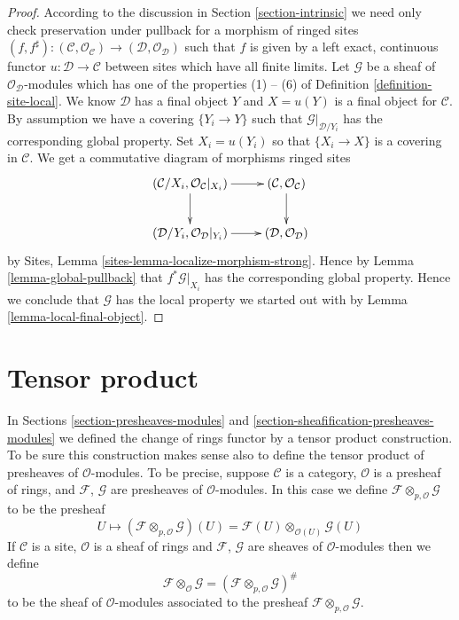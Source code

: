 \begin{proof}
According to the discussion in Section \ref{section-intrinsic}
we need only check preservation under pullback for a morphism of ringed sites
$(f, f^\sharp) :
(\mathcal{C}, \mathcal{O}_\mathcal{C})
\to
(\mathcal{D}, \mathcal{O}_\mathcal{D})$
such that $f$ is given by a left exact, continuous functor
$u : \mathcal{D} \to \mathcal{C}$ between sites which have
all finite limits.
Let $\mathcal{G}$ be a sheaf of $\mathcal{O}_\mathcal{D}$-modules
which has one of the properties (1) -- (6) of
Definition \ref{definition-site-local}.
We know $\mathcal{D}$ has a final object $Y$ and $X = u(Y)$
is a final object for $\mathcal{C}$. By assumption we have
a covering $\{Y_i \to Y\}$ such that $\mathcal{G}|_{\mathcal{D}/Y_i}$
has the corresponding global property. Set $X_i = u(Y_i)$ so
that $\{X_i \to X\}$ is a covering in $\mathcal{C}$.
We get a commutative diagram of morphisms ringed sites
$$
\xymatrix{
(\mathcal{C}/X_i, \mathcal{O}_\mathcal{C}|_{X_i}) \ar[r] \ar[d] &
(\mathcal{C}, \mathcal{O}_\mathcal{C}) \ar[d] \\
(\mathcal{D}/Y_i, \mathcal{O}_\mathcal{D}|_{Y_i}) \ar[r] &
(\mathcal{D}, \mathcal{O}_\mathcal{D})
}
$$
by Sites, Lemma \ref{sites-lemma-localize-morphism-strong}.
Hence by Lemma \ref{lemma-global-pullback}
that $f^*\mathcal{G}|_{X_i}$ has the corresponding global
property. Hence we conclude that $\mathcal{G}$ has the local
property we started out with by Lemma \ref{lemma-local-final-object}.
\end{proof}







\section{Tensor product}
\label{section-tensor-product}

\noindent
In Sections \ref{section-presheaves-modules} and
\ref{section-sheafification-presheaves-modules}
we defined the change of rings functor by a tensor
product construction. To be sure this construction makes sense also
to define the tensor product of presheaves of $\mathcal{O}$-modules.
To be precise, suppose $\mathcal{C}$ is a category,
$\mathcal{O}$ is a presheaf of rings, and $\mathcal{F}$, $\mathcal{G}$
are presheaves of $\mathcal{O}$-modules. In this case we define
$\mathcal{F} \otimes_{p, \mathcal{O}} \mathcal{G}$ to be the presheaf
$$
U
\longmapsto
(\mathcal{F} \otimes_{p, \mathcal{O}} \mathcal{G})(U)
=
\mathcal{F}(U) \otimes_{\mathcal{O}(U)} \mathcal{G}(U)
$$
If $\mathcal{C}$ is a site, $\mathcal{O}$ is a sheaf of rings and
$\mathcal{F}$, $\mathcal{G}$ are sheaves of $\mathcal{O}$-modules
then we define
$$
\mathcal{F} \otimes_\mathcal{O} \mathcal{G}
=
(\mathcal{F} \otimes_{p, \mathcal{O}} \mathcal{G})^\#
$$
to be the sheaf of $\mathcal{O}$-modules associated to the presheaf
$\mathcal{F} \otimes_{p, \mathcal{O}} \mathcal{G}$.

